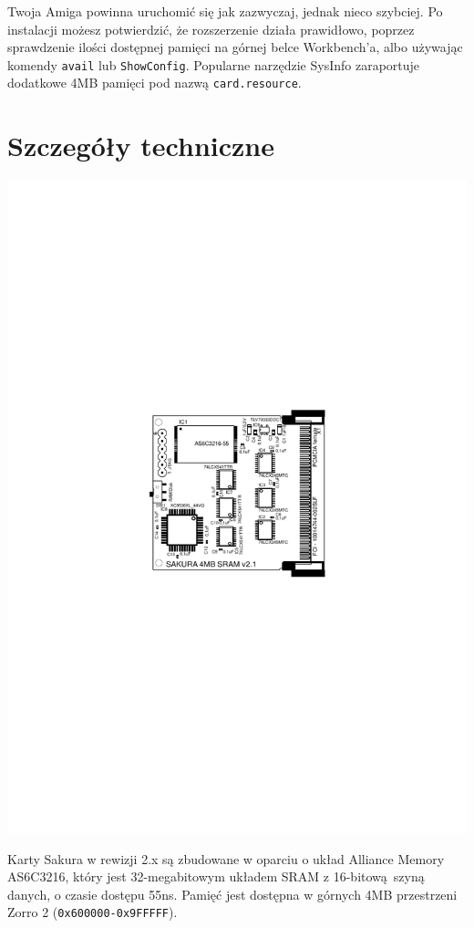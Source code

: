 \documentclass[10pt,a4paper]{article}
\begin{document}
Twoja Amiga powinna uruchomić się jak zazwyczaj, jednak nieco szybciej. Po instalacji możesz potwierdzić, że rozszerzenie działa prawidłowo, poprzez sprawdzenie ilości dostępnej pamięci na górnej belce Workbench'a, albo używając komendy {\tt avail} lub {\tt ShowConfig}. Popularne narzędzie SysInfo zaraportuje dodatkowe 4MB pamięci pod nazwą {\tt card.resource}.

\section*{Szczegóły techniczne}

\begin{center}
\includegraphics{board21layout.pdf}
\end{center}

Karty Sakura w rewizji 2.x są zbudowane w oparciu o układ Alliance Memory AS6C3216, który jest 32-megabitowym układem SRAM z 16-bitową szyną danych, o czasie dostępu 55ns. Pamięć jest dostępna w górnych 4MB przestrzeni Zorro 2 ({\tt 0x600000-0x9FFFFF}).
\end{document}
